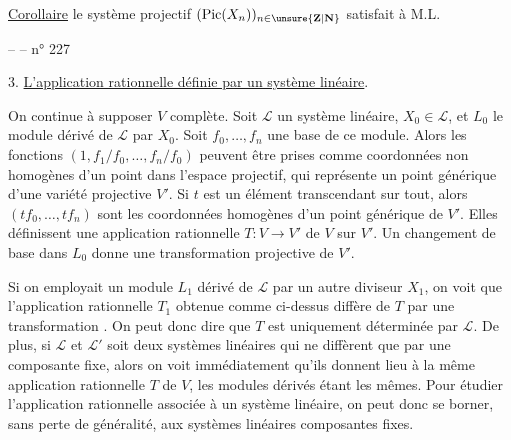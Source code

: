 \uline{Corollaire}  le système projectif $(\operatorname{Pic}(X_n))_{n\in\unsure{\mathbf Z|\mathbf N}}$ satisfait à M.L.






--  -- \hfill n° 227

3. \uline{L'application rationnelle définie par un système linéaire}.

On continue à supposer $V$ complète. Soit $\mathcal L$ un système linéaire, $X_0\in\mathcal L$, et $L_0$ le module dérivé de $\mathcal L$ par $X_0$. Soit $f_0,\ldots,f_n$ une base de ce module. Alors les fonctions $(1,f_1/f_0,\ldots,f_n/f_0)$ peuvent être prises comme coordonnées non homogènes d'un point dans l'espace projectif, qui représente un point générique d'une variété projective $V'$. Si $t$ est un élément transcendant sur tout, alors $(tf_0,\ldots,tf_n)$ sont les coordonnées homogènes d'un point générique de $V'$. Elles définissent une application rationnelle $T:V\longrightarrow V'$ de $V$ sur $V'$. Un changement de base dans $L_0$ donne une transformation projective de $V'$.

Si on employait un module $L_1$ dérivé de $\mathcal L$ par un autre diviseur $X_1$, on voit que l'application rationnelle $T_1$ obtenue comme ci-dessus diffère de $T$ par une transformation . On peut donc dire que $T$ est uniquement déterminée par $\mathcal L$. De plus, si $\mathcal L$ et $\mathcal L'$ soit deux systèmes linéaires qui ne diffèrent que par une composante fixe, alors on voit immédiatement qu'ils donnent lieu à la même application rationnelle $T$ de $V$, les modules dérivés étant les mêmes. Pour étudier l'application rationnelle associée à un système linéaire, on peut donc se borner, sans perte de généralité, aux systèmes linéaires  composantes fixes.

